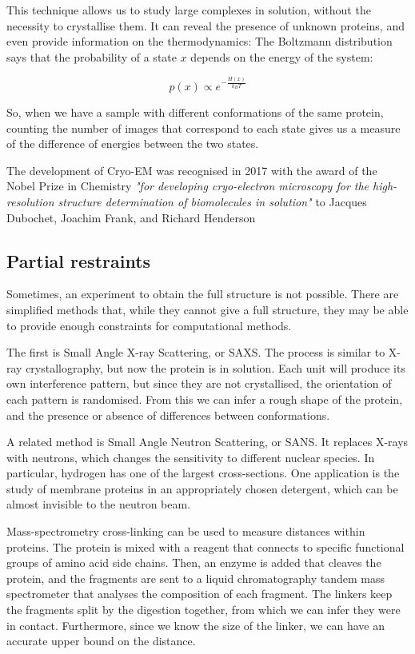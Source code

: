 This technique allows us to study large complexes in solution, without the necessity to crystallise them.
It can reveal the presence of unknown proteins, and even provide information on the thermodynamics:
The Boltzmann distribution says that the probability of a state $x$ depends on the energy of the system:

\begin{equation*}
p(x) \propto e^{-\frac{H(x)}{k_B T}}
\end{equation*}

So, when we have a sample with different conformations of the same protein, counting the number of images that correspond to each state gives us a measure of the difference of energies between the two states.

The development of Cryo-EM was recognised in 2017 with the award of the Nobel Prize in Chemistry \emph{"for developing cryo-electron microscopy for the high-resolution structure determination of biomolecules in solution"} to Jacques Dubochet, Joachim Frank, and Richard Henderson


\subsection{Partial restraints}
Sometimes, an experiment to obtain the full structure is not possible.
There are simplified methods that, while they cannot give a full structure, they may be able to provide enough constraints for computational methods.

The first is Small Angle X-ray Scattering, or SAXS. 
The process is similar to X-ray crystallography, but now the protein is in solution.
Each unit will produce its own interference pattern, but since they are not crystallised, the orientation of each pattern is randomised.
From this we can infer a rough shape of the protein, and the presence or absence of differences between conformations.

A related method is Small Angle Neutron Scattering, or SANS. 
It replaces X-rays with neutrons, which changes the sensitivity to different nuclear species.
In particular, hydrogen has one of the largest cross-sections.
One application is the study of membrane proteins in an appropriately chosen detergent, which can be almost invisible to the neutron beam.

Mass-spectrometry cross-linking can be used to measure distances within proteins.
The protein is mixed with a reagent that connects to specific functional groups of amino acid side chains.
Then, an enzyme is added that cleaves the protein, and the fragments are sent to a liquid chromatography tandem mass spectrometer that analyses the composition of each fragment.
The linkers keep the fragments split by the digestion together, from which we can infer they were in contact.
Furthermore, since we know the size of the linker, we can have an accurate upper bound on the distance.